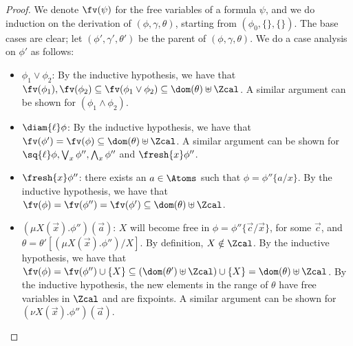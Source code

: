 \begin{proof}
	We denote $\fv(\psi)$ for the free variables of a formula $\psi$, 
	and we do induction on the derivation of $(\phi,\gamma,\theta)$, starting from $(\phi_0,\{\}, \{\})$. 
	The base cases are clear; let $(\phi',\gamma',\theta')$ be the parent of $(\phi, \gamma, \theta)$. 
	We do a case analysis on $\phi'$ as follows:
	\begin{itemize}
		\item $\phi_1 \lor \phi_2$: By the inductive hypothesis,  
		we have that $\fv(\phi_1), \fv(\phi_2) \subseteq \fv(\phi_1 \lor \phi_2) \subseteq \dom(\theta)\uplus \Zcal$.
		A similar argument can be shown for $(\phi_1 \land \phi_2)$.
		\item $\diam{\ell}\phi$: By the inductive hypothesis, 
		we have that $\fv(\phi') = \fv(\phi) \subseteq \dom(\theta) \uplus \Zcal$. 
		A similar argument can be shown for $\sq{\ell}\phi, \bigvee_x \phi'',  \bigwedge_x \phi''$ and $\fresh{x}\phi''$.
		\item $\fresh{x}\phi''$: there exists an $a \in \Atoms$ such that $\phi = \phi''\{a/x\}$. By the inductive hypothesis, we have that $\fv(\phi) = \fv(\phi'') = \fv(\phi') \subseteq \dom(\theta) \uplus \Zcal$.			
		\item $(\mu X(\vec x).\phi'')(\vec a)$: $X$ will become free in $\phi=\phi''\{\vec c/\vec x\}$, for some $\vec c$, and $\theta=\theta'[(\mu X(\vec x).\phi'')/X]$.
		By definition, $X\notin\Zcal$.
		By the inductive hypothesis, we have that 
		$\fv(\phi) =\fv(\phi'') \cup \{X\} \subseteq (\dom(\theta') \uplus \Zcal)\cup \{X\}=\dom(\theta) \uplus \Zcal$. 
		By the inductive hypothesis, the new elements in the range of $\theta$ have free variables in $\Zcal$
		and are fixpoints.
		A similar argument can be shown for $(\nu X(\vec x).\phi'')(\vec a)$.
	\end{itemize}
\end{proof}

\freshClosProps*


